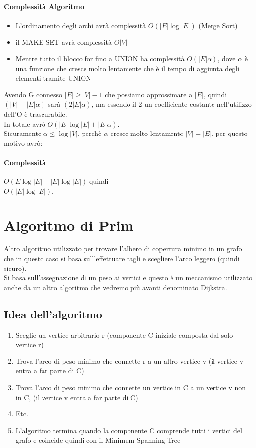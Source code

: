 \paragraph*{Complessità Algoritmo}
\begin{itemize}
    \item L'ordinamento degli archi avrà complessità $O(|E|\log |E|)$ (Merge Sort)
    \item il MAKE SET avrà complessità $O|V|$
    \item Mentre tutto il blocco for fino a UNION ha complessità $O(|E|\alpha)$, dove
    $\alpha$ è una funzione che cresce molto lentamente che è il tempo di aggiunta degli
    elementi tramite UNION
\end{itemize}
Avendo G connesso \ra $|E| \geq |V|-1$ che possiamo approssimare a $|E|$, quindi
$(|V|+|E|\alpha)$ sarà $(2|E|\alpha)$, ma essendo il 2 un coefficiente costante nell'utilizzo
dell'O è trascurabile.\\
In totale avrò $O(|E|\log |E|+|E|\alpha)$.\\
Sicuramente $\alpha \leq \log |V|$, perchè $\alpha$ cresce molto lentamente
$|V| = |E|$, per questo motivo avrò:
\paragraph*{Complessità} $O(E \log|E| + |E|\log |E|)$ quindi\\
$O(|E|\log |E|)$.

\section{Algoritmo di Prim}
Altro algoritmo utilizzato per trovare l'albero di copertura minimo in un grafo che in questo
caso si basa sull'effettuare tagli e scegliere l'arco leggero (quindi sicuro).\\
Si basa sull'assegnazione di un peso ai vertici e questo è un meccanismo utilizzato anche
da un altro algoritmo che vedremo più avanti denominato Dijkstra.
\subsection{Idea dell'algoritmo}
\begin{enumerate}
    \item Sceglie un vertice arbitrario r (componente C iniziale composta dal solo
    vertice r)
    \item Trova l'arco di peso minimo che connette r a un altro vertice v
    (il vertice v entra a far parte di C)
    \item Trova l'arco di peso minimo che connette un vertice in C a un vertice
    v non in C, (il vertice v entra a far parte di C)
    \item Etc.
    \item L'algoritmo termina quando la componente C comprende tutti i vertici
    del grafo e coincide quindi con il Minimum Spanning Tree
\end{enumerate}
